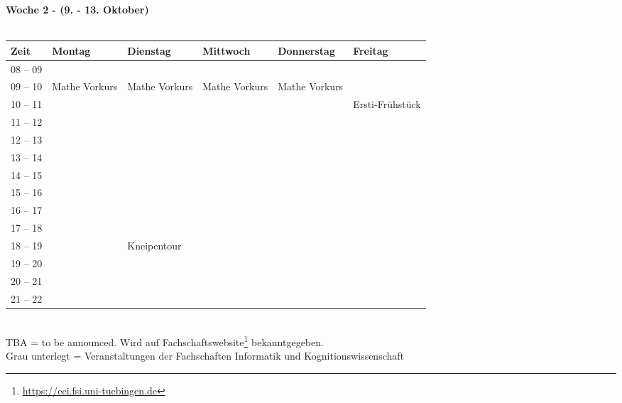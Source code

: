 \textbf{Woche 2 - (9. - 13. Oktober)}\\
\\
\begin{tabular}{|l|p{}|p{}|p{}|p{}|p{}|} \hline
 Zeit & Montag & Dienstag & Mittwoch & Donnerstag & Freitag \\ \hline \hline
 08 -- 09 & & & & & \\ \cline{1-5}
 09 -- 10 & \footnotesize{Mathe Vorkurs} & \footnotesize{Mathe Vorkurs} & \footnotesize{Mathe Vorkurs} & \footnotesize{Mathe Vorkurs} &  \\ \cline{1-1}
 10 -- 11 & & & & &\cellcolor{lightlightgray} \scriptsize{Ersti-Frühstück} \\ \cline{1-1}
 11 -- 12 & & & & & \\ \cline{1-1}
 12 -- 13 & & & & & \\ \cline{1-1}
 13 -- 14 & & & & & \\ \cline{1-1}
 14 -- 15 & & & & & \\ \cline{1-1}
 15 -- 16 & & & & & \\ \cline {1-5}
 16 -- 17 & & & & & \\ \cline{1-1}
 17 -- 18 & & & & & \\ \cline{1-1}
 18 -- 19 & &\cellcolor{lightlightgray} \footnotesize{Kneipentour} & & & \\ \cline{1-1}
 19 -- 20 & &\cellcolor{lightlightgray}  & & & \\ \cline{1-1}
 20 -- 21 & &\cellcolor{lightlightgray}  & & &  \\ \cline{1-1}
 21 -- 22 & &\cellcolor{lightlightgray}  & & & \\ \hline
\end{tabular}
\\
\scriptsize{TBA = to be announced. Wird auf Fachschaftswebsite\footnote{\url{https://eei.fsi.uni-tuebingen.de}}  bekanntgegeben.} \\
\scriptsize{Grau unterlegt = Veranstaltungen der Fachschaften Informatik und Kognitionswissenschaft }
\newpage


